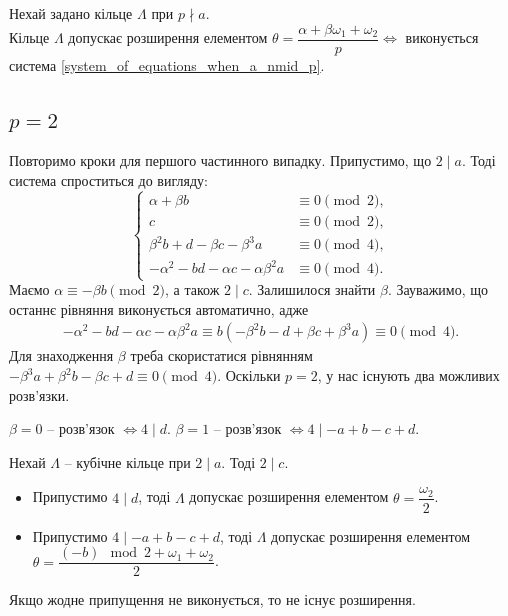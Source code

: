 \documentclass{thesis}
\begin{document}
\begin{proposition}
Нехай задано кільце $\Lambda$ при $p \nmid a$.\\
Кільце $\Lambda$ допускає розширення елементом $\theta = \dfrac{\alpha+ \beta \omega_1 + \omega_2}{p} \iff$ виконується система \eqref{system_of_equations_when_a_nmid_p}.
\end{proposition}

\subsection*{$p = 2$}
Повторимо кроки для першого частинного випадку. Припустимо, що $2 \mid a$. Тоді система спроститься до вигляду:
\begin{equation*}
\begin{cases}
\alpha + \beta b & \equiv 0 \pmod 2, \\
c & \equiv 0 \pmod 2, \\
\beta^2 b + d - \beta c - \beta^3 a & \equiv 0 \pmod {4}, \\
-\alpha^2 - bd - \alpha c - \alpha \beta^2 a & \equiv 0 \pmod {4}.
\end{cases}
\end{equation*}
Маємо $\alpha \equiv -\beta b \pmod 2$, а також $2 \mid c$. Залишилося знайти $\beta$. Зауважимо, що останнє рівняння виконується автоматично, адже
\begin{align*}
-\alpha^2 - bd - \alpha c - \alpha \beta^2 a \equiv b(-\beta^2 b - d + \beta c + \beta^3 a) \equiv 0 \pmod {4}.
\end{align*}
Для знаходження $\beta$ треба скористатися рівнянням $-\beta^3 a + \beta^2 b - \beta c + d \equiv 0 \pmod 4$. Оскільки $p = 2$, у нас існують два можливих розв'язки.

$\beta = 0$ -- розв'язок $\iff 4 \mid d$. $\beta = 1$ -- розв'язок $\iff 4 \mid -a+b-c+d$.

\begin{proposition}
Нехай $\Lambda$ -- кубічне кільце при $2 \mid a$. Тоді $2 \mid c$.
\begin{itemize}
\item Припустимо $4 \mid d$, тоді $\Lambda$ допускає розширення елементом $\theta = \dfrac{\omega_2}{2}$.
\item Припустимо $4 \mid -a+b-c+d$, тоді $\Lambda$ допускає розширення елементом $\theta = \dfrac{(-b) \mod 2 + \omega_1 + \omega_2}{2}$.
\end{itemize}
Якщо жодне припущення не виконується, то не існує розширення.
\end{proposition}
\end{document}
